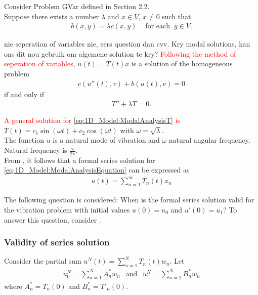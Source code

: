 \documentclass[../../main.tex]{subfiles}
\begin{document}
Consider Problem GVar defined in Section 2.2.\\

Suppose there exists a number $\lambda$ and $x \in V$, $x \neq 0$ such that
\begin{eqnarray}
	b(x,y) = \lambda c(x,y) \ \ \ \ \textrm{ for each } \ y \in V. \label{eq:1D_Model:ModalAnalysisEquation}
\end{eqnarray}

nie seperation of variables nie, eers question dan cvv. Kry modal solutions, kan ons dit nou gebruik om algemene solution te kry?
\textcolor{red}{Following the method of seperation of variables,} $u(t) = T(t)x$ is a solution of the homogeneous problem
\begin{eqnarray}
	c(u''(t),v) + b(u(t),v) = 0
\end{eqnarray}
if and only if
\begin{eqnarray}
	T''  + \lambda T = 0. \label{eq:1D_Model:ModalAnalysisT1}
\end{eqnarray}

\textcolor{red}{A general solution for \eqref{eq:1D_Model:ModalAnalysisT} is} $T(t) = c_1 \sin(\omega t) + c_2 \cos(\omega t)$ with $\omega = \sqrt{\lambda}$.\\

The function $u$ is a natural mode of vibration and $\omega$ natural angular frequency. Natural frequency is $\frac{\omega}{2 \pi}$.\\

From \cite{CVV18}, it follows that a formal series solution for \eqref{eq:1D_Model:ModalAnalysisEquation} can be expressed as
\begin{eqnarray}
	u(t) = \sum_{n=1}^{\infty} T_n(t)x_n \label{eq:1D_Model:ModalAnalysisSeriesSolution}
\end{eqnarray}

The following question is considered: When is the formal series solution valid for the vibration problem with initial values $u(0) = u_0$ and $u'(0) = u_1$? To answer this question, consider \cite{CVV18}.\\

\subsubsection{Validity of series solution}
Consider the partial sum $u^{N}(t) = \sum_{n=1}^{N} T_{n}(t)w_n$. Let
\begin{eqnarray*}
	u_0^{N} = \sum_{n=1}^{N} A^*_n w_n \ \ \textrm{ and } \ \ u_{1}^{N} =\sum_{n=1}^{N} B^*_n w_n
\end{eqnarray*} where $A^*_n = T_n(0)$ and $B^*_n = T'_n(0)$.\\
\end{document}
